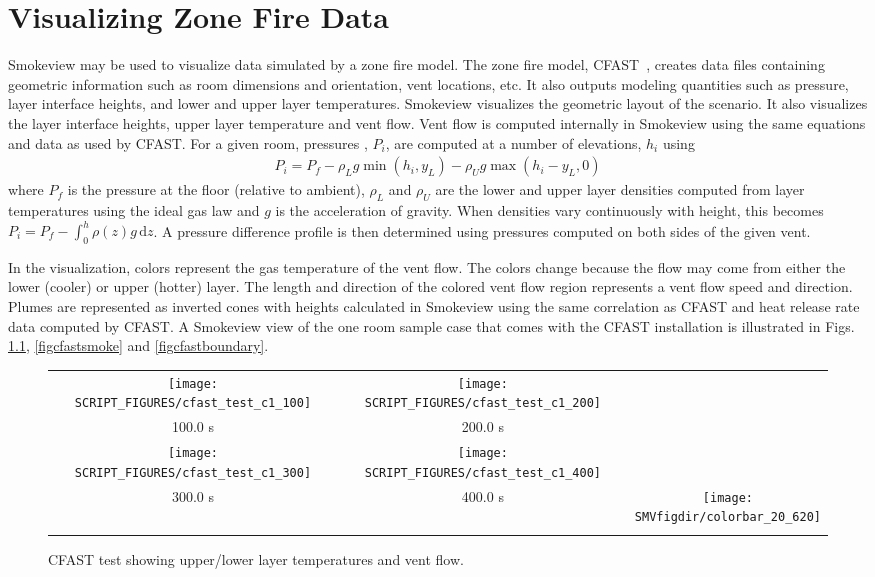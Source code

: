 \documentclass[11pt,twoside]{book}
\begin{document}
\chapter{Visualizing Zone Fire Data}
Smokeview may be used to visualize data simulated by a zone fire
model. The zone fire model, CFAST~\cite{CFAST_Tech_Guide_6}, creates data
files containing geometric information such as room dimensions and
orientation, vent locations, etc.  It also outputs modeling
quantities such as pressure, layer interface heights, and lower
and upper layer temperatures. Smokeview visualizes the geometric
layout of the scenario.  It also visualizes the layer interface
heights, upper layer temperature and vent flow. Vent flow is
computed internally in Smokeview using the same equations and data
as used by CFAST.   For a given room, pressures , $P_i$, are
computed at a number of elevations, $h_i$ using
\begin{eqnarray}
P_i=P_f - \rho_L g \min(h_i,y_L) - \rho_U g \max(h_i-y_L,0)
\end{eqnarray}
where $P_f$ is the pressure at the floor (relative to ambient),
$\rho_L$ and $\rho_U$ are the lower and upper layer densities
computed from layer temperatures using the ideal gas law and $g$
is the acceleration of gravity.  When densities vary continuously
with height, this becomes $P_i=P_f-\int_0^h \rho(z)g\,\mbox{d}z$. A
pressure difference profile is then determined using pressures
computed on both sides of the given vent.

In the visualization, colors represent the gas temperature of the
vent flow.  The colors change because the flow may come from
either the lower (cooler) or upper (hotter) layer.   The length
and direction of the colored vent flow region represents a vent
flow speed and direction.  Plumes are represented as inverted
cones with heights calculated in Smokeview using the same
correlation as CFAST and heat release rate data computed by CFAST.
A Smokeview view of the one room sample case that comes with the
CFAST installation is illustrated in Figs. \ref{figcfast}, \ref{figcfastsmoke}
and \ref{figcfastboundary}.

\begin{figure}[bph]
\begin{center}
\begin{tabular}{ccc}
\texttt{[image: SCRIPT\_FIGURES/cfast\_test\_c1\_100]}&
\texttt{[image: SCRIPT\_FIGURES/cfast\_test\_c1\_200]}\\
100.0 s&200.0 s\\
\texttt{[image: SCRIPT\_FIGURES/cfast\_test\_c1\_300]}&
\texttt{[image: SCRIPT\_FIGURES/cfast\_test\_c1\_400]}\\
300.0 s&400.0 s
&\raisebox{0.0ex}[0pt]{\texttt{[image: \\SMVfigdir/colorbar\_20\_620]}}\\
\\
\end{tabular}
\end{center}
\caption{CFAST test showing upper/lower layer temperatures and vent flow.}
\label{figcfast}%
\end{figure}
\end{document}
